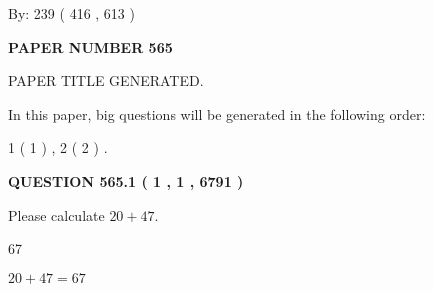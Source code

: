 \documentclass[12pt]{article}
\begin{document}
   
\hspace{1.0in} By: 
 239 ( 416 ,  613 )
   
   
   
   
\newpage 
\setcounter{page}{ 
   565001 } 
   
   
   
   
 {\textbf{ \Large{ PAPER NUMBER  565  }}}
   
   
\vspace{0.2in}
   
   
   
   
   
   
   
   
 \vspace{0.2in}
 
 
 
 
   
   
 PAPER TITLE GENERATED.
   
   
   
\vspace{0.2in}
   
In this paper, big questions will be generated in the following order: 
   
   
   1 ( 1 )
 ,
   2 ( 2 )
 .
  
\vspace{0.2in}
  
{\textbf{\Large{QUESTION
565.1 
 ( 1 , 1 , 6791 )
}}}
  
  
 
Please calculate $ %
20 +  %
47 $.
 
 
 
\noindent{}
 
 

67
 
 
\noindent{}
 
 

 
 
 
\noindent{}
 
 

$ %
20 +  %
47=   %
67$
 
 
\noindent{}
 
\end{document}
